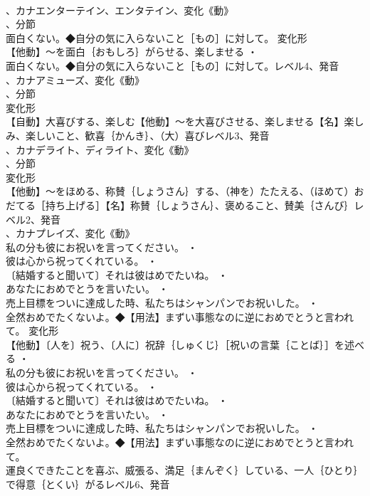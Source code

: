 \documentclass[8pt]{extreport}
\begin{document}
\begin{CJK}{UTF8}{min}
\\	、カナエンターテイン、エンタテイン、変化《動》
\\	、分節
\\	面白くない。◆自分の気に入らないこと［もの］に対して。	変化形 
\\	【他動】～を面白｛おもしろ｝がらせる、楽しませる ・
\\	面白くない。◆自分の気に入らないこと［もの］に対して。レベル4、発音
\\	、カナアミューズ、変化《動》
\\	、分節
\\	変化形 
\\	【自動】大喜びする、楽しむ【他動】～を大喜びさせる、楽しませる【名】楽しみ、楽しいこと、歓喜｛かんき｝、（大）喜びレベル3、発音
\\	、カナデライト、ディライト、変化《動》
\\	、分節
\\	変化形 
\\	【他動】～をほめる、称賛｛しょうさん｝する、（神を）たたえる、（ほめて）おだてる［持ち上げる］【名】称賛｛しょうさん｝、褒めること、賛美｛さんび｝レベル2、発音
\\	、カナプレイズ、変化《動》
\\	私の分も彼にお祝いを言ってください。 ・
\\	彼は心から祝ってくれている。 ・
\\	〔結婚すると聞いて〕それは彼はめでたいね。 ・
\\	あなたにおめでとうを言いたい。 ・
\\	売上目標をついに達成した時、私たちはシャンパンでお祝いした。 ・
\\	全然おめでたくないよ。◆【用法】まずい事態なのに逆におめでとうと言われて。	変化形 
\\	【他動】〔人を〕祝う、〔人に〕祝辞｛しゅくじ｝［祝いの言葉｛ことば｝］を述べる ・
\\	私の分も彼にお祝いを言ってください。 ・
\\	彼は心から祝ってくれている。 ・
\\	〔結婚すると聞いて〕それは彼はめでたいね。 ・
\\	あなたにおめでとうを言いたい。 ・
\\	売上目標をついに達成した時、私たちはシャンパンでお祝いした。 ・
\\	全然おめでたくないよ。◆【用法】まずい事態なのに逆におめでとうと言われて。
\\	運良くできたことを喜ぶ、威張る、満足｛まんぞく｝している、一人｛ひとり｝で得意｛とくい｝がるレベル6、発音

\end{CJK}
\end{document}
